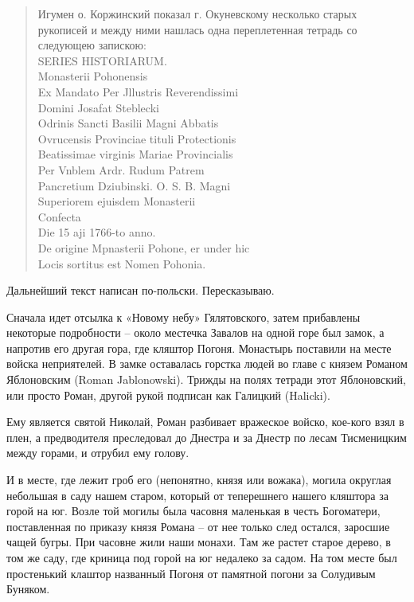\begin{quotation}
Игумен о. Коржинский показал г. Окуневскому несколько старых рукописей и между ними нашлась одна переплетенная тетрадь со следующею запискою:\\

SERIES HISTORIARUM.\\
Monasterii Pohonensis\\
Ex Mandato Per Jllustris Reverendissimi\\
Domini Josafat Steblecki\\
Odrinis Sancti Basilii Magni Abbatis\\
Ovrucensis Provinciae tituli Protectionis\\
Beatissimae virginis Mariae Provincialis\\
Per Vnblem Ardr. Rudum Patrem\\
Pancretium Dziubinski. O. S. B. Magni\\
Superiorem ejuisdem Monasterii\\
Confecta\\

Die 15 aji 1766-to anno.\\

De origine Mpnasterii Pohone, er under hic\\
Locis sortitus est Nomen Pohonia.
\end{quotation}

Дальнейший текст написан по-польски. Пересказываю.

Сначала идет отсылка к «Новому небу» Гялятовского, затем прибавлены некоторые подробности – около местечка Завалов на одной горе был замок, а напротив его другая гора, где кляштор Погоня. Монастырь поставили на месте войска неприятелей. В замке оставалась горстка людей во главе с князем Романом Яблоновским (Roman Jablonowski). Трижды на полях тетради этот Яблоновский, или просто Роман, другой рукой подписан как Галицкий (Halicki). 

Ему является святой Николай, Роман разбивает вражеское войско, кое-кого взял в плен, а предводителя преследовал до Днестра и за Днестр по лесам Тисменицким между горами, и отрубил ему голову.

И в месте, где лежит гроб его (непонятно, князя или вожака), могила округлая небольшая в саду нашем старом, который от теперешнего нашего кляштора за горой на юг. Возле той могилы была часовня маленькая в честь Богоматери, поставленная по приказу князя Романа – от нее только след остался, заросшие чащей бугры. При часовне жили наши монахи. Там же растет старое дерево, в том же саду, где криница под горой на юг недалеко за садом. На том месте был простенький клаштор названный Погоня от памятной погони за Солудивым Буняком.

